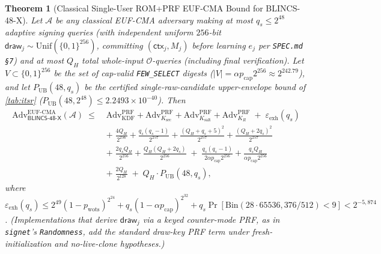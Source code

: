 \documentclass[11pt,a4paper]{article}
\newtheorem{theorem}{Theorem}
\theoremstyle{definition}
\theoremstyle{remark}
\newcommand{\BLINCS}{\textsf{BLINCS-48-X}}
\newcommand{\Adv}{\mathrm{Adv}}
\newcommand{\bits}{\{0,1\}}
\newcommand{\Unif}{\mathrm{Unif}}
\begin{document}
\begin{theorem}[Classical Single-User ROM+PRF EUF-CMA Bound for \BLINCS{}]
\label{thm:euf-cma-rom}
Let $\mathcal{A}$ be any classical EUF-CMA adversary making at most $q_s \le 2^{48}$ adaptive signing queries (with independent uniform $256$-bit $\mathsf{draw}_j \sim \Unif(\bits^{256})$, committing $(\mathsf{ctx}_j, M_j)$ before learning $e_j$ per \texttt{SPEC.md §7}) and at most $Q_H$ total whole-input $\mathcal{O}$-queries (including final verification). Let $V \subset \bits^{256}$ be the set of cap-valid \texttt{FEW\_SELECT} digests ($|V| = \alpha p_{\mathrm{cap}} 2^{256} \approx 2^{242.79}$), and let $P_{\mathrm{UB}}(48, q_s)$ be the certified single-raw-candidate upper-envelope bound of \cref{tab:itsr} ($P_{\mathrm{UB}}(48, 2^{48}) \le 2.2493 \times 10^{-40}$). Then
\begin{align}
\label{eq:euf-cma-rom}
  \Adv^{\mathrm{EUF\text{-}CMA}}_{\BLINCS}(\mathcal{A})
  \;\le\;&
    \Adv^{\mathrm{PRF}}_{\mathrm{KDF}} + \Adv^{\mathrm{PRF}}_{K_{\mathrm{sec}}} + \Adv^{\mathrm{PRF}}_{K_{\mathrm{salt}}} + \Adv^{\mathrm{PRF}}_{K_R}
    \;+\; \varepsilon_{\mathrm{exh}}(q_s) \nonumber \\
  &+\; \frac{4 Q_H}{2^{256}} + \frac{q_s(q_s - 1)}{2^{257}} + \frac{(Q_H + q_s + 5)^2}{2^{257}} + \frac{(Q_H + 2 q_s)^2}{2^{257}} \nonumber \\
  &+\; \frac{2 q_s Q_H}{2^{256}} + \frac{Q_H(Q_H + 2 q_s)}{2^{256}}
    \;+\; \frac{q_s(q_s - 1)}{2 \alpha p_{\mathrm{cap}} 2^{256}} + \frac{q_s Q_H}{\alpha p_{\mathrm{cap}} 2^{256}} \nonumber \\
  &+\; \frac{2 Q_H}{2^{128}}
    \;+\; Q_H \cdot P_{\mathrm{UB}}(48, q_s),
\end{align}
where $\varepsilon_{\mathrm{exh}}(q_s) \le 2^{49} (1 - p_{\mathrm{wots}})^{2^{24}} + q_s (1 - \alpha p_{\mathrm{cap}})^{2^{32}} + q_s \Pr[\mathrm{Bin}(28 \cdot 65536, 376/512) < 9] < 2^{-5{,}874}$. (Implementations that derive $\mathsf{draw}_j$ via a keyed counter-mode PRF, as in \texttt{signet}'s \texttt{Randomness}, add the standard draw-key PRF term under fresh-initialization and no-live-clone hypotheses.)
\end{theorem}
\end{document}
